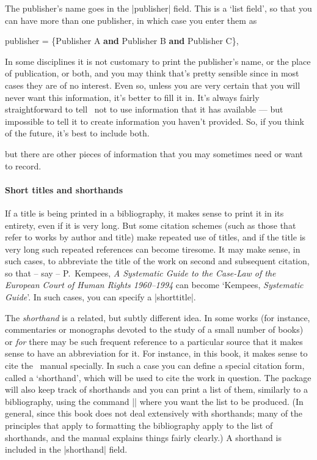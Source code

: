 {The publisher's name goes in the |publisher| field. This is a `list field', so that you can have more than one publisher, in which case you enter them as
\begin{center}
\ttfamily
publisher = \{Publisher A \textbf{and} Publisher B \textbf{and} Publisher C\},
\end{center}

In some disciplines it is not customary to print the publisher's name, or the place of publication, or both, and you may think that's pretty sensible since in most cases they are of no interest. Even so, unless you are very certain that you will never want this information, it's better to fill it in. It's always fairly straightforward to tell \biblatex\ not to use information that it has available --- but impossible to tell it to create information you haven't provided. So, if you think of the future, it's best to include both.

 but there are other pieces of information that you may sometimes need or want to record.

\paragraph{Short titles and shorthands} If a title is being printed in a bibliography, it makes sense to print it in its entirety, even if it is very long. But some citation schemes (such as those that refer to works by author and title) make repeated use of titles, and if the title is very long such repeated references can become tiresome. It may make sense, in such cases, to abbreviate the title of the work on second and subsequent citation, so that -- say -- P.\ Kempees, \emph{A Systematic Guide to the Case-Law of the European Court of Human Rights 1960--1994} can become `Kempees, \emph{Systematic Guide}'. In such cases, you can specify a |shorttitle|.

The \emph{shorthand} is a related, but subtly different idea. In some works (for instance, commentaries or monographs devoted to the study of a small number of books) or \emph{for} there may be such frequent reference to a particular source that it makes sense to have an abbreviation for it. For instance, in this book, it makes sense to cite the \biblatex\ manual specially. In such a case you can define a special citation form, called a `shorthand', which will be used to cite the work in question. The package will also keep track of shorthands and you can print a list of them, similarly to a bibliography, using the command |\printshorthands| where you want the list to be produced. (In general, since this book does not deal extensively with shorthands; many of the principles that apply to formatting the bibliography apply to the list of shorthands, and the manual explains things fairly clearly.) A shorthand is included in the |shorthand| field.

}
